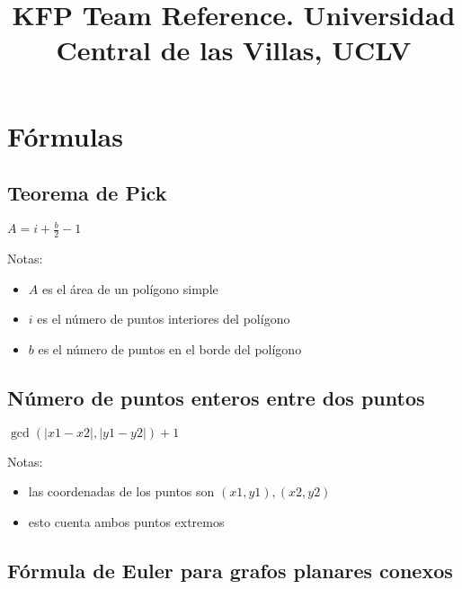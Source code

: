 \documentclass[10pt]{article}
\title{\vspace{-4ex}\Large{KFP Team Reference. Universidad Central de las Villas, UCLV}}
\author{}
\date{}
\begin{document}
\begin{landscape}

\maketitle
\vspace{-13ex}

\begin{multicols}{2}

\tableofcontents
\pagestyle{fancy}



\end{multicols}

\pagebreak

\section{Fórmulas}

\subsection{Teorema de Pick}

$A = i + \frac{b}{2} - 1$

Notas:
\begin{itemize}
	\item $A$ es el área de un polígono simple
	\item $i$ es el número de puntos interiores del polígono
	\item $b$ es el número de puntos en el borde del polígono
\end{itemize}

\subsection{Número de puntos enteros entre dos puntos}

$\gcd (\lvert x1 - x2 \rvert, \lvert y1 - y2 \rvert) + 1$

Notas:
\begin{itemize}
	\item las coordenadas de los puntos son $(x1, y1), (x2, y2)$
	\item esto cuenta ambos puntos extremos
\end{itemize}

\subsection{Fórmula de Euler para grafos planares conexos}


\end{landscape}
\end{document}
